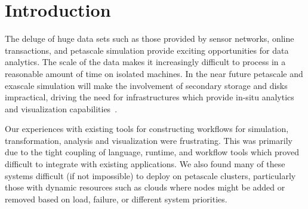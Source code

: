 \section{Introduction}

The deluge of huge data sets such as those provided by sensor
networks, online transactions, and petascale simulation provide 
exciting opportunities for data analytics.  
The scale of the data makes it increasingly difficult to process 
in a reasonable amount of time on isolated machines.
In the near future petascale and exascale simulation will make 
the involvement of secondary storage and disks impractical, driving
the need for infrastructures which provide in-situ analytics and
visualization capabilities~\cite{ma:in-site}.

Our experiences with existing tools for constructing workflows
for simulation, transformation, analysis and visualization were frustrating.
This was primarily due to the tight coupling of language, runtime, and
workflow tools which proved difficult to integrate with existing
applications.  
We also found many of these systems difficult (if not impossible)
to deploy on petascale clusters, particularly those with dynamic
resources such as clouds where nodes might be added or removed based
on load, failure, or different system priorities.
%

